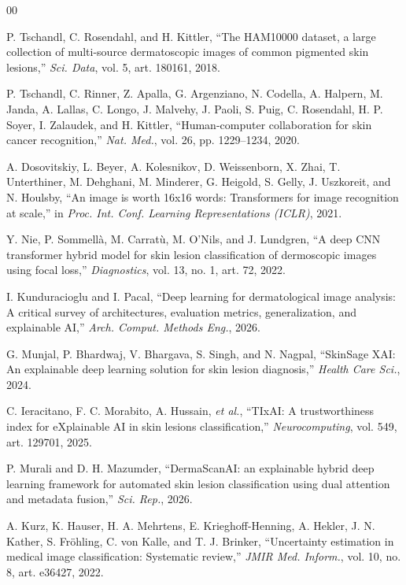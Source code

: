 \documentclass[conference]{IEEEtran}
\begin{document}
\begin{thebibliography}{00}

 P. Tschandl, C. Rosendahl, and H. Kittler, ``The HAM10000 dataset, a
large collection of multi-source dermatoscopic images of common pigmented skin lesions,''
\emph{Sci. Data}, vol. 5, art. 180161, 2018.

 P. Tschandl, C. Rinner, Z. Apalla, G. Argenziano, N. Codella, A.
Halpern, M. Janda, A. Lallas, C. Longo, J. Malvehy, J. Paoli, S. Puig, C. Rosendahl, H. P.
Soyer, I. Zalaudek, and H. Kittler, ``Human-computer collaboration for skin cancer
recognition,'' \emph{Nat. Med.}, vol. 26, pp. 1229--1234, 2020.

 A. Dosovitskiy, L. Beyer, A. Kolesnikov, D. Weissenborn, X. Zhai,
T. Unterthiner, M. Dehghani, M. Minderer, G. Heigold, S. Gelly, J. Uszkoreit, and N.
Houlsby, ``An image is worth 16x16 words: Transformers for image recognition at scale,'' in
\emph{Proc. Int. Conf. Learning Representations (ICLR)}, 2021.

 Y. Nie, P. Sommell\`a, M. Carrat\`u, M. O'Nils, and J. Lundgren, ``A deep
CNN transformer hybrid model for skin lesion classification of dermoscopic images using
focal loss,'' \emph{Diagnostics}, vol. 13, no. 1, art. 72, 2022.

 I. Kunduracioglu and I. Pacal, ``Deep learning for
dermatological image analysis: A critical survey of architectures, evaluation metrics,
generalization, and explainable AI,'' \emph{Arch. Comput. Methods Eng.}, 2026.

 G. Munjal, P. Bhardwaj, V. Bhargava, S. Singh, and N. Nagpal,
``SkinSage XAI: An explainable deep learning solution for skin lesion diagnosis,''
\emph{Health Care Sci.}, 2024.

 C. Ieracitano, F. C. Morabito, A. Hussain, \emph{et al.}, ``TIxAI:
A trustworthiness index for eXplainable AI in skin lesions classification,''
\emph{Neurocomputing}, vol. 549, art. 129701, 2025.

 P. Murali and D. H. Mazumder, ``DermaScanAI: an explainable hybrid
deep learning framework for automated skin lesion classification using dual attention and
metadata fusion,'' \emph{Sci. Rep.}, 2026.

 A. Kurz, K. Hauser, H. A. Mehrtens, E. Krieghoff-Henning, A. Hekler, J.
N. Kather, S. Fr\"ohling, C. von Kalle, and T. J. Brinker, ``Uncertainty estimation in
medical image classification: Systematic review,'' \emph{JMIR Med. Inform.}, vol. 10, no.
8, art. e36427, 2022.


\end{thebibliography}
\end{document}
